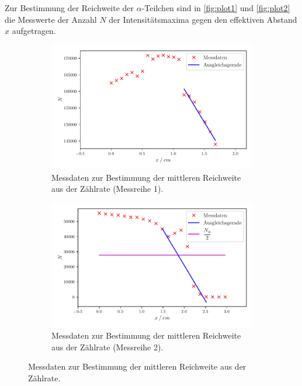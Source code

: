 Zur Bestimmung der Reichweite der $\alpha$-Teilchen sind in \autoref{fig:plot1} und \autoref{fig:plot2} die Messwerte der Anzahl $N$ der Intensitätsmaxima
gegen den effektiven Abstand $x$ aufgetragen.
\begin{figure}[H]
\begin{subfigure}{\textwidth}
  \centering
  \includegraphics[scale=0.75]{build/plot1.pdf}
  \caption {Messdaten zur Bestimmung der mittleren Reichweite aus der Zählrate (Messreihe 1).}
  \label{fig:plot1}
\end{subfigure}
\hfill
\begin{subfigure}{\textwidth}
  \centering
  \includegraphics[scale=0.75]{build/plot2.pdf}
  \caption {Messdaten zur Bestimmung der mittleren Reichweite aus der Zählrate (Messreihe 2).}
  \label{fig:plot2}
\end{subfigure}
  \caption {Messdaten zur Bestimmung der mittleren Reichweite aus der Zählrate.}
\end{figure}

